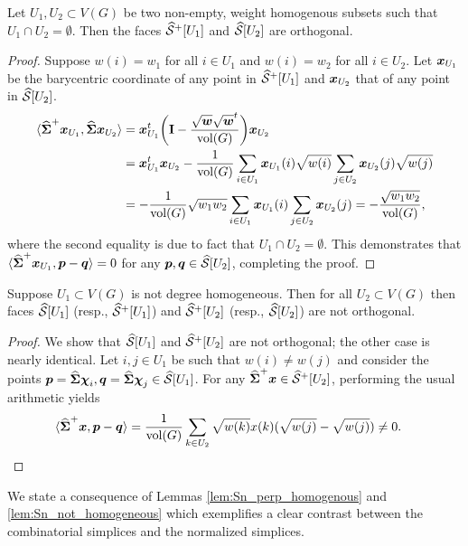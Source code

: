 \begin{lemma}
	\label{lem:Sn_perp_homogenous}
	Let $U_1,U_2\subset V(G)$ be two non-empty, weight homogenous subsets such that $U_1\cap U_2=\emptyset$. Then the faces $\widehat{\mathcal{S}}^+[U_1]$ and $\widehat{\mathcal{S}}[U_2]$ are orthogonal. 
\end{lemma}
\begin{proof}
	Suppose $w(i)=w_1$ for all $i\in U_1$ and $w(i)=w_2$ for all $i\in U_2$. Let $\vb*{x}_{U_1}$ be the barycentric coordinate of any point in $\widehat{\mathcal{S}}^+[U_1]$ and $\vb*{x}_{U_2}$ that of any point in $\widehat{\mathcal{S}}[U_2]$. 
	\begin{align*}
	\langle \widehat{\boldsymbol{\Sigma}}^+\vb*{x}_{U_1},\widehat{\boldsymbol{\Sigma}}\vb*{x}_{U_2}\rangle &= \vb*{x}_{U_1}^t \bigg(\vb{I}-\frac{\sqrt{\vb*{w}}\sqrt{\vb*{w}}^t}{\textnormal{vol}(G)}\bigg) \vb*{x}_{U_2}\\
	&= \vb*{x}_{U_1}^t\vb*{x}_{U_2} - \frac{1}{\textnormal{vol}(G)}\sum_{i\in U_1}\vb*{x}_{U_1}(i)\sqrt{w(i)}\sum_{j\in U_2}\vb*{x}_{U_2}(j) \sqrt{w(j)} \\
	&= -\frac{1}{\textnormal{vol}(G)}\sqrt{w_1w_2}\sum_{i\in U_1}\vb*{x}_{U_1}(i) \sum_{j\in U_2}\vb*{x}_{U_2}(j) = -\frac{\sqrt{w_1w_2}}{\textnormal{vol}(G)},
	\end{align*} 
	where the second equality is due to fact that $U_1\cap U_2=\emptyset$. This demonstrates that $\langle \widehat{\boldsymbol{\Sigma}}^+\vb*{x}_{U_1},\vb*{p}-\vb*{q}\rangle=0$ for any $\vb*{p},\vb*{q}\in\widehat{\mathcal{S}}[U_2]$, completing the proof. 
\end{proof}

\begin{lemma}
	\label{lem:Sn_not_homogeneous}
	Suppose  $U_1\subset V(G)$ is not degree homogeneous. Then for all $U_2\subset V(G)$ then faces $\widehat{\mathcal{S}}[U_1]$ (resp., $\widehat{\mathcal{S}}^+[U_1]$) and $\widehat{\mathcal{S}}^+[U_2]$ (resp., $\widehat{\mathcal{S}}[U_2]$) are not orthogonal. 
\end{lemma}
\begin{proof}
	We show that $\widehat{\mathcal{S}}[U_1]$ and $\widehat{\mathcal{S}}^+[U_2]$ are not orthogonal; the other case is nearly identical. Let $i,j\in U_1$ be such that $w(i)\neq w(j)$ and consider the points $\vb*{p}=\widehat{\boldsymbol{\Sigma}}\boldsymbol{\chi}_i,\vb*{q}=\widehat{\boldsymbol{\Sigma}}\boldsymbol{\chi}_j\in\widehat{\mathcal{S}}[U_1]$. For any $\widehat{\boldsymbol{\Sigma}}^+\vb*{x}\in\widehat{\mathcal{S}}^+[U_2]$, performing the usual arithmetic yields
	\begin{align*}
	\langle \widehat{\boldsymbol{\Sigma}}^+\vb*{x},\vb*{p}-\vb*{q}\rangle &= \frac{1}{\textnormal{vol}(G)} \sum_{k\in U_2}\sqrt{w(k)}x(k)(\sqrt{w(j)}-\sqrt{w(j)}) \neq 0.\qedhere
	\end{align*}
\end{proof}

We state a consequence of Lemmas \ref{lem:Sn_perp_homogenous} and \ref{lem:Sn_not_homogeneous} which exemplifies a clear contrast between  the combinatorial simplices and the normalized simplices.   

